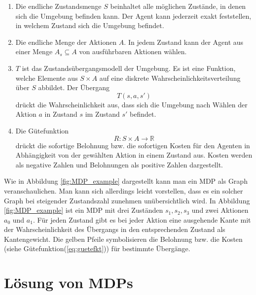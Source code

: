 \documentclass[a4paper]{IEEEtran}
\begin{document}
\begin{enumerate}
	\item Die endliche Zustandsmenge $S$ beinhaltet alle möglichen Zustände, in denen sich die Umgebung befinden kann. Der Agent kann jederzeit exakt feststellen, in welchem Zustand sich die Umgebung befindet.
	\item Die endliche Menge der Aktionen $A$. In jedem Zustand kann der Agent aus einer Menge $A_s \subseteq A$ von ausführbaren Aktionen wählen.
	\item $T$ ist das Zustandsübergangsmodell der Umgebung. Es ist eine Funktion, welche Elemente aus $S \times A$ auf eine diskrete Wahrscheinlichkeitsverteilung über $S$ abbildet. Der Übergang
	\begin{equation}
		T(s, a, s')
	\end{equation}
	drückt die Wahrscheinlichkeit aus, dass sich die Umgebung nach Wählen der Aktion $a$ in Zustand $s$ im Zustand $s'$ befindet.
	\item Die Gütefunktion
	\begin{equation}
		R: S \times A \rightarrow \mathbb{R}
		\label{eq:guetefkt}
	\end{equation}
	drückt die sofortige Belohnung bzw. die sofortigen Kosten für den Agenten in Abhängigkeit von der gewählten Aktion in einem Zustand aus. Kosten werden als negative Zahlen und Belohnungen als positive Zahlen dargestellt.
\end{enumerate}
Wie in Abbildung \ref{fig:MDP_example} dargestellt kann man ein MDP als Graph veranschaulichen. Man kann sich allerdings leicht vorstellen, dass es ein solcher Graph bei steigender Zustandszahl zunehmen unübersichtlich wird.
In Abbildung \ref{fig:MDP_example} ist ein MDP mit drei Zuständen $s_1, s_2, s_3$ und zwei Aktionen $a_0$ und $a_1$. Für jeden Zustand gibt es bei jeder Aktion eine ausgehende Kante mit der Wahrscheinlichkeit des Übergangs in den entsprechenden Zustand als Kantengewicht. Die gelben Pfeile symbolisieren die Belohnung bzw. die Kosten (siehe Gütefunktion(\ref{eq:guetefkt})) für bestimmte Übergänge.


\section{Lösung von MDPs}
\end{document}
